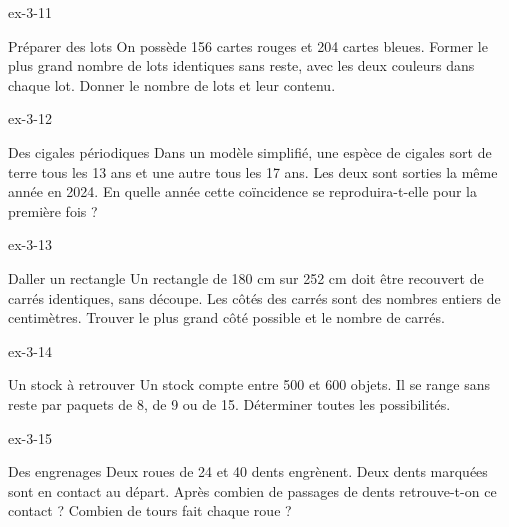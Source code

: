 \clearpage{}
\begin{blocLivre}{ex-3-11}\begin{exercice}[3]{Préparer des lots}
On possède 156 cartes rouges et 204 cartes bleues. Former le plus grand nombre de lots identiques sans reste, avec les deux couleurs dans chaque lot. Donner le nombre de lots et leur contenu.
\end{exercice}\end{blocLivre}
\begin{blocLivre}{ex-3-12}\begin{exercice}[3]{Des cigales périodiques}
Dans un modèle simplifié, une espèce de cigales sort de terre tous les 13 ans et une autre tous les 17 ans. Les deux sont sorties la même année en 2024. En quelle année cette coïncidence se reproduira-t-elle pour la première fois ?
\end{exercice}\end{blocLivre}
\begin{blocLivre}{ex-3-13}\begin{exercice}[3]{Daller un rectangle}
Un rectangle de 180 cm sur 252 cm doit être recouvert de carrés identiques, sans découpe. Les côtés des carrés sont des nombres entiers de centimètres. Trouver le plus grand côté possible et le nombre de carrés.
\label{fig-ex-3-13}
\end{exercice}\end{blocLivre}
\begin{blocLivre}{ex-3-14}\begin{exercice}[3]{Un stock à retrouver}
Un stock compte entre 500 et 600 objets. Il se range sans reste par paquets de 8, de 9 ou de 15. Déterminer toutes les possibilités.
\end{exercice}\end{blocLivre}
\begin{blocLivre}{ex-3-15}\begin{exercice}[3]{Des engrenages}
Deux roues de 24 et 40 dents engrènent. Deux dents marquées sont en contact au départ. Après combien de passages de dents retrouve-t-on ce contact ? Combien de tours fait chaque roue ?
\label{fig-ex-3-15}
\end{exercice}\end{blocLivre}

\clearpage
